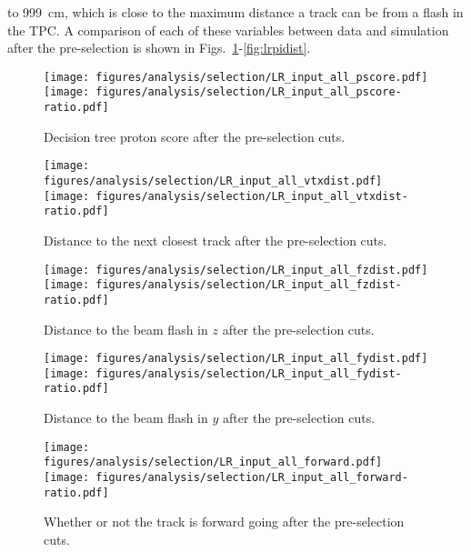     to 999~cm, which is close to the maximum distance a track can be from a
    flash in the TPC. A comparison of each of these variables between data and
    simulation after the pre-selection is shown in
    Figs.~\ref{fig:lrpid}-\ref{fig:lrpidist}.
    \begin{figure}[ht]
      \centering
      \texttt{[image: figures/analysis/selection/LR\_input\_all\_pscore.pdf]} \\
      \texttt{[image: figures/analysis/selection/LR\_input\_all\_pscore-ratio.pdf]}
      \caption{Decision tree proton score after the pre-selection cuts.}
      \label{fig:lrpid}
    \end{figure}
    \begin{figure}[ht]
      \centering
      \texttt{[image: figures/analysis/selection/LR\_input\_all\_vtxdist.pdf]} \\
      \texttt{[image: figures/analysis/selection/LR\_input\_all\_vtxdist-ratio.pdf]}
      \caption{Distance to the next closest track after the pre-selection cuts.}
      \label{fig:lrvtxdist}
    \end{figure}
    \begin{figure}[ht]
      \centering
      \texttt{[image: figures/analysis/selection/LR\_input\_all\_fzdist.pdf]} \\
      \texttt{[image: figures/analysis/selection/LR\_input\_all\_fzdist-ratio.pdf]}
      \caption{Distance to the beam flash in $z$ after the
        pre-selection cuts.}
      \label{fig:lrfzdist}
    \end{figure}
    \begin{figure}[ht]
      \centering
      \texttt{[image: figures/analysis/selection/LR\_input\_all\_fydist.pdf]} \\
      \texttt{[image: figures/analysis/selection/LR\_input\_all\_fydist-ratio.pdf]}
      \caption{Distance to the beam flash in $y$ after the
        pre-selection cuts.}
      \label{fig:lrfydist}
    \end{figure}
    \begin{figure}[ht]
      \centering
      \texttt{[image: figures/analysis/selection/LR\_input\_all\_forward.pdf]} \\
      \texttt{[image: figures/analysis/selection/LR\_input\_all\_forward-ratio.pdf]}
      \caption{Whether or not the track is forward going after the pre-selection
        cuts.}
      \label{fig:lrforward}
    \end{figure}
